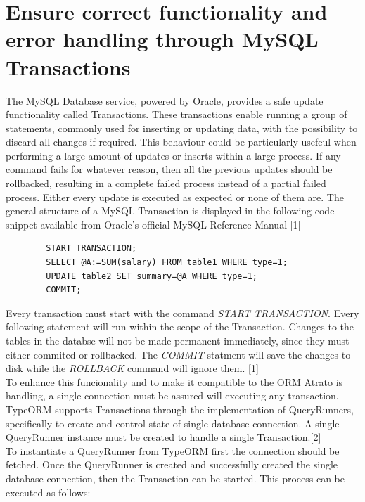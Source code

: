\section{Ensure correct functionality and error handling through MySQL Transactions}

The MySQL Database service, powered by Oracle, provides a safe update functionality called Transactions. These transactions enable running a group of statements, commonly used for inserting or updating data, with the possibility to discard all changes if required. This behaviour could be particularly usefeul when performing a large amount of updates or inserts within a large process. If any command fails for whatever reason, then all the previous updates should be rollbacked, resulting in a complete failed process instead of a partial failed process. Either every update is executed as expected or none of them are. The general structure of a MySQL Transaction is displayed in the following code snippet available from Oracle's official MySQL Reference Manual [1]

\begin{center}
    \begin{verbatim}
        START TRANSACTION;
        SELECT @A:=SUM(salary) FROM table1 WHERE type=1;
        UPDATE table2 SET summary=@A WHERE type=1;
        COMMIT;
    \end{verbatim}
\end{center}

Every transaction must start with the command \textit{START TRANSACTION}. Every following statement will run within the scope of the Transaction. Changes to the tables in the databse will not be made permanent immediately, since they must either commited or rollbacked. The \textit{COMMIT} statment will save the changes to disk while the \textit{ROLLBACK} command will ignore them. [1]\\

To enhance this funcionality and to make it compatible to the ORM Atrato is handling, a single connection must be assured will executing any transaction. TypeORM supports Transactions through the implementation of QueryRunners, specifically to create and control state of single database connection. A single QueryRunner instance must be created to handle a single Transaction.[2]\\ 

To instantiate a QueryRunner from TypeORM first the connection should be fetched. Once the QueryRunner is created and successfully created the single database connection, then the Transaction can be started. This process can be executed as follows:

